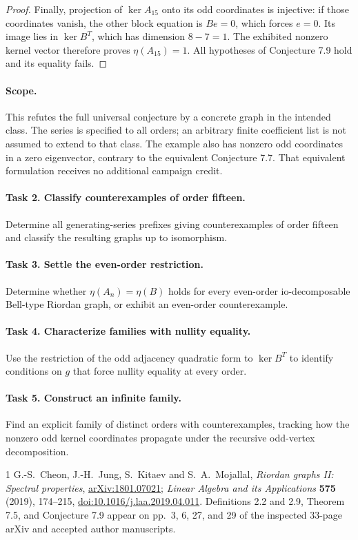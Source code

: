 \documentclass[10pt]{article}
\begin{document}
\begin{proof}
Finally, projection of \(\ker A_{15}\) onto its odd coordinates
is injective: if those coordinates vanish, the other block equation
is \(Be=0\), which forces \(e=0\). Its image lies in
\(\ker B^T\), which has dimension \(8-7=1\). The exhibited
nonzero kernel vector therefore proves \(\eta(A_{15})=1\).
All hypotheses of Conjecture 7.9 hold and its equality fails.
\end{proof}

\paragraph{Scope.}
This refutes the full universal conjecture by a concrete graph in the
intended class. The series is specified to all orders; an arbitrary
finite coefficient list is not assumed to extend to that class.
The example also has nonzero odd coordinates in a zero eigenvector,
contrary to the equivalent Conjecture 7.7. That equivalent formulation
receives no additional campaign credit.

\paragraph{Task 2. Classify counterexamples of order fifteen.}
Determine all generating-series prefixes giving counterexamples of
order fifteen and classify the resulting graphs up to isomorphism.

\paragraph{Task 3. Settle the even-order restriction.}
Determine whether \(\eta(A_n)=\eta(B)\) holds for every even-order
io-decomposable Bell-type Riordan graph, or exhibit an even-order
counterexample.

\paragraph{Task 4. Characterize families with nullity equality.}
Use the restriction of the odd adjacency quadratic form to
\(\ker B^T\) to identify conditions on \(g\) that force nullity
equality at every order.

\paragraph{Task 5. Construct an infinite family.}
Find an explicit family of distinct orders with counterexamples,
tracking how the nonzero odd kernel coordinates propagate under
the recursive odd-vertex decomposition.

\begin{thebibliography}{1}
 G.-S.~Cheon, J.-H.~Jung, S.~Kitaev and S.~A.~Mojallal,
\emph{Riordan graphs II: Spectral properties},
\href{https://arxiv.org/abs/1801.07021}{arXiv:1801.07021};
\emph{Linear Algebra and its Applications} \textbf{575} (2019),
174--215, \href{https://doi.org/10.1016/j.laa.2019.04.011}
{doi:10.1016/j.laa.2019.04.011}.
Definitions 2.2 and 2.9, Theorem 7.5, and Conjecture 7.9
appear on pp.~3, 6, 27, and 29 of the inspected 33-page
arXiv and accepted author manuscripts.
\end{thebibliography}
\end{document}
